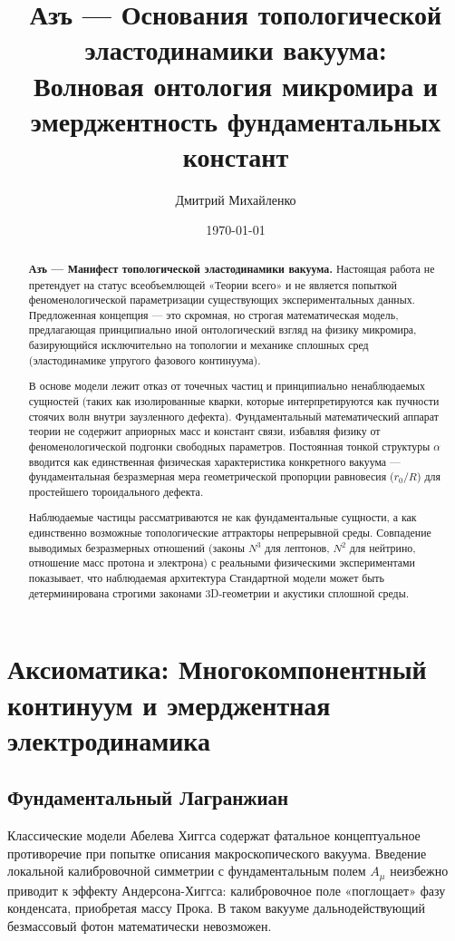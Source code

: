 \documentclass[11pt,a4paper]{article}
\title{\textbf{Азъ — Основания топологической\\ эластодинамики вакуума:\\ Волновая онтология микромира и эмерджентность фундаментальных констант}}
\author{Дмитрий Михайленко}
\date{\today}
\begin{document}
	
	\maketitle
	
	\begin{abstract}
		\textbf{Азъ — Манифест топологической эластодинамики вакуума.} 
		Настоящая работа не претендует на статус всеобъемлющей «Теории всего» и не является попыткой феноменологической параметризации существующих экспериментальных данных. Предложенная концепция — это скромная, но строгая математическая модель, предлагающая принципиально иной онтологический взгляд на физику микромира, базирующийся исключительно на топологии и механике сплошных сред (эластодинамике упругого фазового континуума).
		
		В основе модели лежит отказ от точечных частиц и принципиально ненаблюдаемых сущностей (таких как изолированные кварки, которые интерпретируются как пучности стоячих волн внутри заузленного дефекта). Фундаментальный математический аппарат теории не содержит априорных масс и констант связи, избавляя физику от феноменологической подгонки свободных параметров. Постоянная тонкой структуры $\alpha$ вводится как единственная физическая характеристика конкретного вакуума — фундаментальная безразмерная мера геометрической пропорции равновесия ($r_0/R$) для простейшего тороидального дефекта. 
		
		Наблюдаемые частицы рассматриваются не как фундаментальные сущности, а как единственно возможные топологические аттракторы непрерывной среды. Совпадение выводимых безразмерных отношений (законы $N^3$ для лептонов, $N^2$ для нейтрино, отношение масс протона и электрона) с реальными физическими экспериментами показывает, что наблюдаемая архитектура Стандартной модели может быть детерминирована строгими законами 3D-геометрии и акустики сплошной среды.
	\end{abstract}
	
	\section{Аксиоматика: Многокомпонентный континуум и эмерджентная электродинамика}
	
	\subsection{Фундаментальный Лагранжиан}
	Классические модели Абелева Хиггса содержат фатальное концептуальное противоречие при попытке описания макроскопического вакуума. Введение локальной калибровочной симметрии с фундаментальным полем $A_\mu$ неизбежно приводит к эффекту Андерсона-Хиггса: калибровочное поле «поглощает» фазу конденсата, приобретая массу Прока. В таком вакууме дальнодействующий безмассовый фотон математически невозможен.
	
\end{document}
